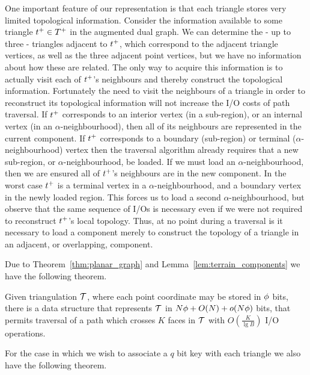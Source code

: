 One important feature of our representation is that each triangle stores 
very limited topological information. 
Consider the information available to some triangle 
$t^+ \in T^+$ in the augmented dual graph. 
We can determine the - up to three - triangles adjacent to $t^+$, which 
correspond to the adjacent triangle vertices, as well as the three 
adjacent point vertices, but we have no information about how these are related.  
The only way to acquire this information is to actually visit each of 
$t^+$'s neighbours and thereby construct the topological 
information. 
Fortunately the need to visit the neighbours of a triangle in order to reconstruct 
its topological information will not increase the I/O costs of path traversal. 
If $t^+$ corresponds to an interior vertex (in a sub-region), or an 
internal vertex (in an $\alpha$-neighbourhood), then all of its neighbours are 
represented in the current component. 
If $t^+$ corresponds to a boundary (sub-region) or terminal 
($\alpha$-neighbourhood) vertex then the traversal algorithm already requires 
that a new sub-region, or $\alpha$-neighbourhood, be loaded. 
If we must load an $\alpha$-neighbourhood, then we are ensured all of 
$t^+$'s neighbours are in the new component. 
In the worst case $t^+$ is a terminal vertex in a 
$\alpha$-neighbourhood, and a boundary vertex in the newly loaded region. 
This forces us to load a second $\alpha$-neighbourhood, but observe that 
the same sequence of I/Os is necessary even if we were not required to 
reconstruct $t^+$'s local topology. 
Thus, at no point during a traversal is it necessary to load a component 
merely to construct the topology of a triangle in an adjacent, or overlapping,
component.

Due to Theorem~\ref{thm:planar_graph} and Lemma~\ref{lem:terrain_components} we
have the following theorem.

\begin{theorem}\label{thm:terrain_traversal}
Given triangulation $\mathcal{T}$, where each point coordinate may be stored in 
$\phi$ bits, there is a data structure that represents $\mathcal{T}$ in 
$N\phi + O(N) +o(N\phi)$ bits, that permits traversal of a path 
which crosses $K$ faces in $\mathcal{T}$ with 
$O \left( \frac{K}{ \lg{B} } \right)$ I/O operations.
\end{theorem} 

For the case in which we wish to associate a $q$ bit key with each 
triangle we also have the following theorem.

